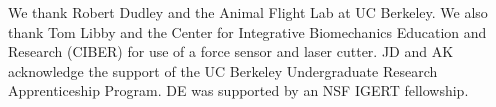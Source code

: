 




We thank Robert Dudley and the Animal Flight Lab at UC Berkeley.  We also thank Tom Libby and the Center for Integrative Biomechanics Education and Research (CIBER) for use of a force sensor and laser cutter.  JD and AK acknowledge the support of the UC Berkeley Undergraduate Research Apprenticeship Program.  DE was supported by an NSF IGERT fellowship. 

